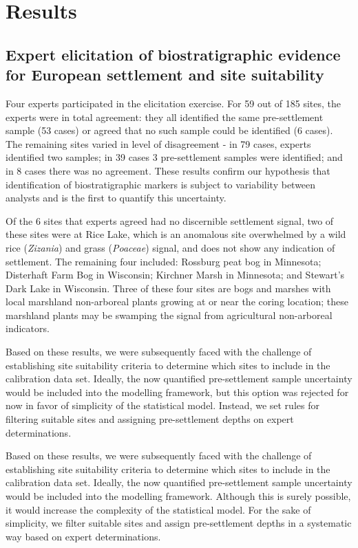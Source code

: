 \documentclass[12pt]{article}
\begin{document}
\section{Results}

\subsection{Expert elicitation of biostratigraphic evidence for European settlement and site suitability}

Four experts participated in the elicitation exercise. For 59 out of
185 sites, the experts were in total agreement: they all identified
the same pre-settlement sample (53 cases) or agreed that no such
sample could be identified (6 cases). The remaining sites varied in
level of disagreement - in 79 cases, experts identified two samples;
in 39 cases 3 pre-settlement samples were identified; and in 8 cases
there was no agreement. These results confirm our hypothesis that
identification of biostratigraphic markers is subject to variability
between analysts and is the first to quantify this uncertainty.

Of the 6 sites that experts agreed had no discernible settlement
signal, two of these sites were at Rice Lake, which is an anomalous
site overwhelmed by a wild rice (\textit{Zizania}) and grass
(\textit{Poaceae}) signal, and does not show any indication of
settlement. The remaining four included: Rossburg peat bog in
Minnesota; Disterhaft Farm Bog in Wisconsin; Kirchner Marsh in
Minnesota; and Stewart’s Dark Lake in Wisconsin. Three of these four
sites are bogs and marshes with local marshland non-arboreal plants
growing at or near the coring location; these marshland plants may be
swamping the signal from agricultural non-arboreal indicators.

Based on these results, we were subsequently faced with the challenge
of establishing site suitability criteria to determine which sites to
include in the calibration data set. Ideally, the now quantified
pre-settlement sample uncertainty would be included into the modelling
framework, but this option was rejected for now in favor of simplicity
of the statistical model. Instead, we set rules for filtering suitable
sites and assigning pre-settlement depths on expert determinations.

Based on these results, we were subsequently faced with the challenge
of establishing site suitability criteria to determine which sites to
include in the calibration data set. Ideally, the now quantified
pre-settlement sample uncertainty would be included into the modelling
framework. Although this is surely possible, it would increase the
complexity of the statistical model. For the sake of simplicity, we
filter suitable sites and assign pre-settlement depths in a systematic
way based on expert determinations.
\end{document}

